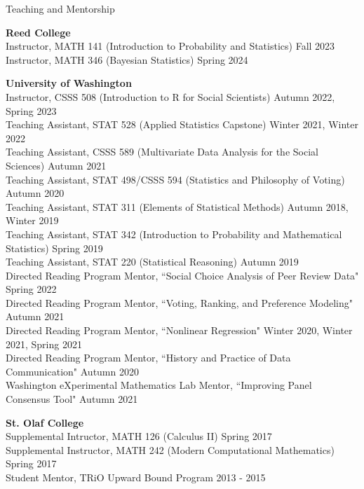 \documentclass{resume} %
\begin{document}
\begin{rSection}{Teaching and Mentorship}

\textbf{Reed College}
\\ Instructor, MATH 141 (Introduction to Probability and Statistics) \hfill {Fall 2023}
\\ Instructor, MATH 346 (Bayesian Statistics) \hfill {Spring 2024}

\textbf{University of Washington}
\\ Instructor, CSSS 508 (Introduction to R for Social Scientists) \hfill {Autumn 2022, Spring 2023}
\\ Teaching Assistant, STAT 528 (Applied Statistics Capstone) \hfill {Winter 2021, Winter 2022}
\\ Teaching Assistant, CSSS 589 (Multivariate Data Analysis for the Social Sciences) \hfill Autumn 2021
\\ Teaching Assistant, STAT 498/CSSS 594 (Statistics and Philosophy of Voting) \hfill Autumn 2020
\\ Teaching Assistant, STAT 311 (Elements of Statistical Methods) \hfill {Autumn 2018, Winter 2019}
\\ Teaching Assistant, STAT 342 (Introduction to Probability and Mathematical Statistics) \hfill {Spring 2019}
\\ Teaching Assistant, STAT 220 (Statistical Reasoning) \hfill {Autumn 2019}
\\ Directed Reading Program Mentor, ``Social Choice Analysis of Peer Review Data" \hfill {Spring 2022}
\\ Directed Reading Program Mentor, ``Voting, Ranking, and Preference Modeling" \hfill {Autumn 2021}
\\ Directed Reading Program Mentor, ``Nonlinear Regression" \hfill {Winter 2020, Winter 2021, Spring 2021}
\\ Directed Reading Program Mentor, ``History and Practice of Data Communication" \hfill {Autumn 2020}
\\ Washington eXperimental Mathematics Lab Mentor, ``Improving Panel Consensus Tool" \hfill {Autumn 2021}

\textbf{St. Olaf College}
\\ Supplemental Intructor, MATH 126 (Calculus II) \hfill {Spring 2017}
\\ Supplemental Instructor, MATH 242 (Modern Computational Mathematics) \hfill {Spring 2017}
\\ Student Mentor, TRiO Upward Bound Program \hfill {2013 - 2015}

\end{rSection}
\end{document}

